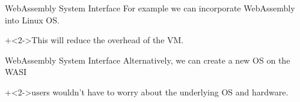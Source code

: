 \begin{frame}{WebAssembly System Interface}{}
    For example we can incorporate WebAssembly into Linux OS.
    \vspace{4ex}

    \onslide+<2->{This will reduce the overhead of the VM.}
\end{frame}


\begin{frame}{WebAssembly System Interface}{}
    Alternatively, we can create a new OS on the WASI
    \vspace{4ex}
    
    \onslide+<2->{users wouldn't have to worry about the underlying OS and hardware.}
\end{frame}
